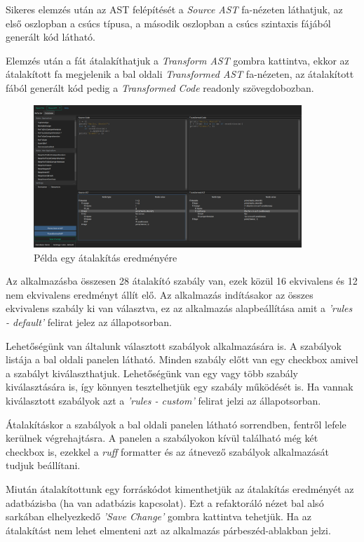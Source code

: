 Sikeres elemzés után az AST felépítését a \emph{Source AST} fa-nézeten láthatjuk, 
az első oszlopban a csúcs típusa, a második oszlopban a csúcs szintaxis fájából generált kód látható. 

Elemzés után a fát átalakíthatjuk a \emph{Transform AST} gombra kattintva, 
ekkor az átalakított fa megjelenik a bal oldali \emph{Transformed AST} fa-nézeten,
az átalakított fából generált kód pedig a \emph{Transformed Code} readonly szövegdobozban.

\begin{figure}[H]
	\centering
	\includegraphics[width=0.9\textwidth]{images/screenshots/refactor_tab_2.png}
	\caption{Példa egy átalakítás eredményére}
\end{figure}

Az alkalmazásba összesen 28 átalakító szabály van, ezek közül 16 ekvivalens és 12 nem ekvivalens
eredményt állít elő.
Az alkalmazás indításakor az összes ekvivalens szabály ki van választva,
ez az alkalmazás alapbeállítása amit a \emph{'rules - default'} felirat jelez az állapotsorban.

Lehetőségünk van általunk választott szabályok alkalmazására is.
A szabályok listája a bal oldali panelen látható. Minden szabály előtt van egy checkbox
amivel a szabályt kiválaszthatjuk. Lehetőségünk van egy vagy több szabály kiválasztására is,
így könnyen tesztelhetjük egy szabály működését is.
Ha vannak kiválasztott szabályok azt a \emph{'rules - custom'} felirat jelzi az állapotsorban.

Átalakításkor a szabályok a bal oldali panelen látható sorrendben, fentről lefele kerülnek végrehajtásra.
A panelen a szabályokon kívül található még két checkbox is,
ezekkel a \emph{ruff} formatter és az átnevező szabályok alkalmazását tudjuk beállítani.

Miután átalakítottunk egy forráskódot kimenthetjük az átalakítás eredményét az adatbázisba
(ha van adatbázis kapcsolat).
Ezt a refaktoráló nézet bal alsó sarkában elhelyezkedő \emph{'Save Change'} gombra kattintva tehetjük.
Ha az átalakítást nem lehet elmenteni azt az alkalmazás párbeszéd-ablakban jelzi.

